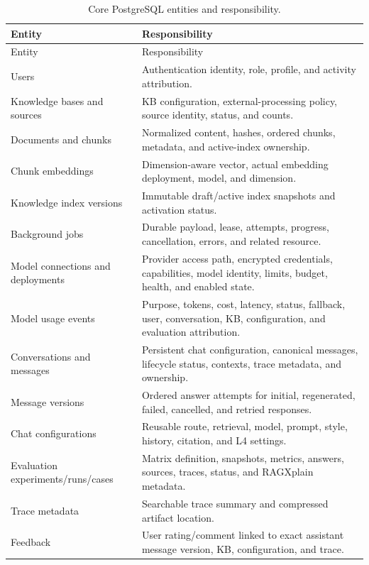 \begin{longtable}{p{}p{}}
  \caption{Core PostgreSQL entities and responsibility.}
  \label{tab:persistence-entities}\\
  \toprule
  Entity & Responsibility\\
  \midrule
  \endfirsthead
  \toprule
  Entity & Responsibility\\
  \midrule
  \endhead
  Users & Authentication identity, role, profile, and activity attribution.\\
  Knowledge bases and sources & KB configuration, external-processing policy,
  source identity, status, and counts.\\
  Documents and chunks & Normalized content, hashes, ordered chunks, metadata,
  and active-index ownership.\\
  Chunk embeddings & Dimension-aware vector, actual embedding deployment,
  model, and dimension.\\
  Knowledge index versions & Immutable draft/active index snapshots and
  activation status.\\
  Background jobs & Durable payload, lease, attempts, progress, cancellation,
  errors, and related resource.\\
  Model connections and deployments & Provider access path, encrypted
  credentials, capabilities, model identity, limits, budget, health, and
  enabled state.\\
  Model usage events & Purpose, tokens, cost, latency, status, fallback, user,
  conversation, KB, configuration, and evaluation attribution.\\
  Conversations and messages & Persistent chat configuration, canonical
  messages, lifecycle status, contexts, trace metadata, and ownership.\\
  Message versions & Ordered answer attempts for initial, regenerated, failed,
  cancelled, and retried responses.\\
  Chat configurations & Reusable route, retrieval, model, prompt, style,
  history, citation, and L4 settings.\\
  Evaluation experiments/runs/cases & Matrix definition, snapshots, metrics,
  answers, sources, traces, status, and RAGXplain metadata.\\
  Trace metadata & Searchable trace summary and compressed artifact location.\\
  Feedback & User rating/comment linked to exact assistant message version,
  KB, configuration, and trace.\\
  \bottomrule
\end{longtable}

